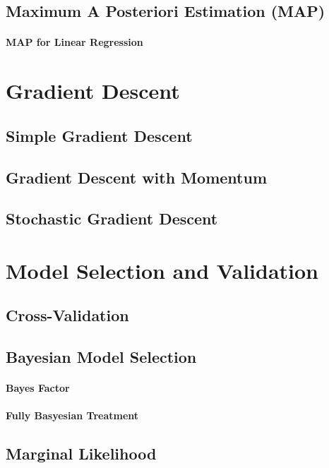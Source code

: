 	\subsection{Maximum A Posteriori Estimation (MAP)}

		\paragraph*{MAP for Linear Regression}

\section{Gradient Descent}

	\subsection{Simple Gradient Descent}

	\subsection{Gradient Descent with Momentum}

	\subsection{Stochastic Gradient Descent}


\section{Model Selection and Validation}

	\subsection{Cross-Validation}

	\subsection{Bayesian Model Selection}
		\paragraph*{Bayes Factor}

		\paragraph*{Fully Basyesian Treatment}

	\subsection{Marginal Likelihood}

